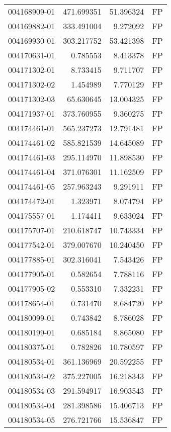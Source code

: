 \begin{tabular}{lrrl}
004168909-01 &  471.699351 &    51.396324 &   FP \\
004169882-01 &  333.491004 &     9.272092 &   FP \\
004169930-01 &  303.217752 &    53.421398 &   FP \\
004170631-01 &    0.785553 &     8.413378 &   FP \\
004171302-01 &    8.733415 &     9.711707 &   FP \\
004171302-02 &    1.454989 &     7.770129 &   FP \\
004171302-03 &   65.630645 &    13.004325 &   FP \\
004171937-01 &  373.760955 &     9.360275 &   FP \\
004174461-01 &  565.237273 &    12.791481 &   FP \\
004174461-02 &  585.821539 &    14.645089 &   FP \\
004174461-03 &  295.114970 &    11.898530 &   FP \\
004174461-04 &  371.076301 &    11.162509 &   FP \\
004174461-05 &  257.963243 &     9.291911 &   FP \\
004174472-01 &    1.323971 &     8.074794 &   FP \\
004175557-01 &    1.174411 &     9.633024 &   FP \\
004175707-01 &  210.618747 &    10.743334 &   FP \\
004177542-01 &  379.007670 &    10.240450 &   FP \\
004177885-01 &  302.316041 &     7.543426 &   FP \\
004177905-01 &    0.582654 &     7.788116 &   FP \\
004177905-02 &    0.553310 &     7.332231 &   FP \\
004178654-01 &    0.731470 &     8.684720 &   FP \\
004180099-01 &    0.743842 &     8.786028 &   FP \\
004180199-01 &    0.685184 &     8.865080 &   FP \\
004180375-01 &    0.782826 &    10.780597 &   FP \\
004180534-01 &  361.136969 &    20.592255 &   FP \\
004180534-02 &  375.227005 &    16.218343 &   FP \\
004180534-03 &  291.594917 &    16.903543 &   FP \\
004180534-04 &  281.398586 &    15.406713 &   FP \\
004180534-05 &  276.721766 &    15.536847 &   FP \\

\end{tabular}
